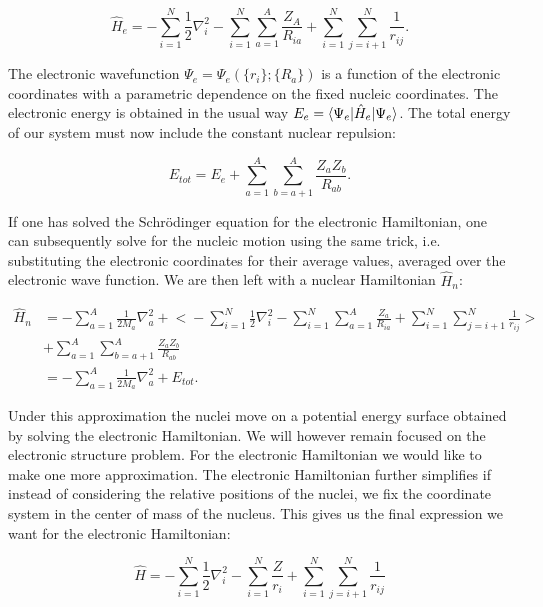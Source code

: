 \begin{equation}
    \hat{H}_e = -\sum_{i=1}^N \frac{1}{2} \nabla_i^2
    -\sum_{i=1}^N \sum_{a=1}^A \frac{Z_A}{R_{ia}}
    +\sum_{i=1}^N \sum_{j=i+1}^N \frac{1}{r_{ij}} .
\end{equation}

The electronic wavefunction $\Psi_e = \Psi_e(\{r_i\}; \{R_a\})$
is a function of the electronic coordinates with a parametric dependence
on the fixed nucleic coordinates. The electronic energy
is obtained in the usual way $E_{e} = \braket{\Psi_e | \hat{H}_e |
\Psi_e} $. The total energy of our system
must now include the constant nuclear repulsion:

$$ E_{tot} = E_{e} + \sum_{a=1}^A \sum_{b=a+1}^A
    \frac{Z_a Z_b}{R_{ab}} . $$

If one has solved the Schr\"{o}dinger equation for the electronic
Hamiltonian, one can subsequently solve for the nucleic motion
using the same trick, i.e. substituting the electronic coordinates
for their average values, averaged over the electronic wave function.
We are then left with a nuclear Hamiltonian $\hat{H}_n$:

\begin{equation}
    \begin{split}
        \hat{H}_n
        &= -\sum_{a=1}^A \frac{1}{2 M_a} \nabla_a^2
        + \biggl< -\sum_{i=1}^N \frac{1}{2} \nabla_i^2
        - \sum_{i=1}^N \sum_{a=1}^A \frac{Z_a}{R_{ia}}
        + \sum_{i=1}^N \sum_{j=i+1}^N \frac{1}{r_{ij}}
        \biggr> \\
        &+ \sum_{a=1}^A \sum_{b=a+1}^A
        \frac{Z_a Z_b}{R_{ab}} \\
        &= -\sum_{a=1}^A \frac{1}{2 M_a} \nabla_a^2
        + E_{tot} .
    \end{split}
\end{equation}

Under this approximation the nuclei move on a potential energy
surface obtained by solving the electronic Hamiltonian.
We will however remain focused on the electronic structure problem.
For the electronic Hamiltonian we would like to make one more
approximation.
The electronic Hamiltonian further simplifies if instead
of considering the relative positions of the nuclei,
we fix the coordinate system in the center of mass of the nucleus.
This gives us the final expression we want for the electronic
Hamiltonian:

\begin{equation}
    \hat{H} = -\sum_{i=1}^N \frac{1}{2} \nabla_i^2
    - \sum_{i=1}^N \frac{Z}{r_{i}} + \sum_{i=1}^N \sum_{j=i+1}^N
    \frac{1}{r_{ij}}
\end{equation}

